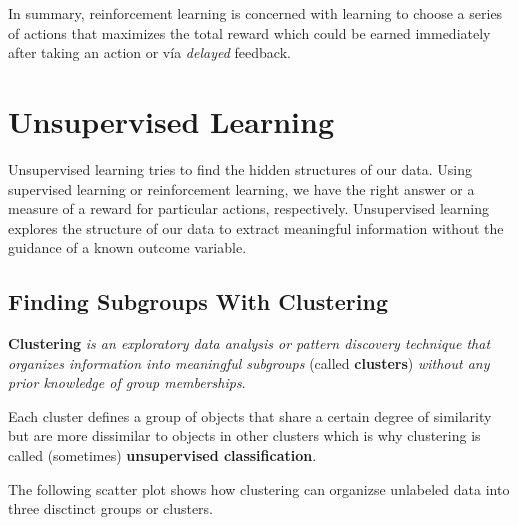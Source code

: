 \documentclass[../machine_learning_scikit.tex]{subfiles}
\begin{document}
    \begin{idea}
        In summary, reinforcement learning is concerned with learning to choose a series of actions that maximizes the total reward which could be earned immediately after taking an action or vía \textit{delayed} feedback.
    \end{idea}

    \section{Unsupervised Learning}

    Unsupervised learning tries to find the hidden structures of our data. Using supervised learning or reinforcement learning, we have the right answer or a measure of a reward for particular actions, respectively. Unsupervised learning explores the structure of our data to extract meaningful information without the guidance of a known outcome variable.

    \subsection{Finding Subgroups With Clustering}

    \begin{mydef}
        \textbf{Clustering} \textit{is an exploratory data analysis or pattern discovery technique that organizes information into meaningful subgroups} (called \textbf{clusters}) \textit{without any prior knowledge of group memberships}.
    \end{mydef}

    Each cluster defines a group of objects that share a certain degree of similarity but are more dissimilar to objects in other clusters which is why clustering is called (sometimes) \textbf{unsupervised classification}.

    The following scatter plot shows how clustering can organizse unlabeled data into three disctinct groups or clusters.
\end{document}
